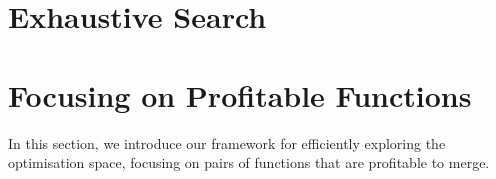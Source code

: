 \section{Exhaustive Search}


\section{Focusing on Profitable Functions}
\label{sec:framework}



In this section, we introduce our framework for efficiently exploring the
optimisation space, focusing on pairs of functions that are profitable to merge. 



